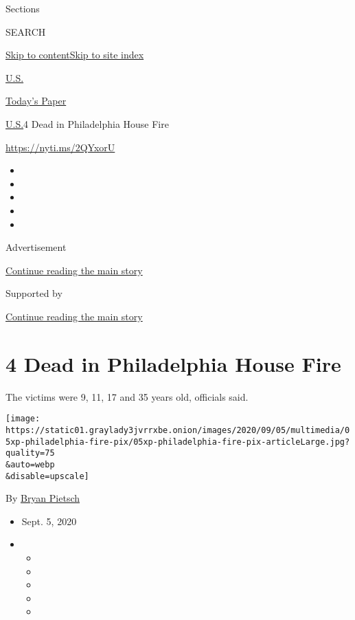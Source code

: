 Sections

SEARCH

\protect\hyperlink{site-content}{Skip to
content}\protect\hyperlink{site-index}{Skip to site index}

\href{https://www.nytimes3xbfgragh.onion/section/us}{U.S.}

\href{https://myaccount.nytimes3xbfgragh.onion/auth/login?response_type=cookie\&client_id=vi}{}

\href{https://www.nytimes3xbfgragh.onion/section/todayspaper}{Today's
Paper}

\href{/section/us}{U.S.}\textbar{}4 Dead in Philadelphia House Fire

\url{https://nyti.ms/2QYxorU}

\begin{itemize}
\item
\item
\item
\item
\item
\end{itemize}

Advertisement

\protect\hyperlink{after-top}{Continue reading the main story}

Supported by

\protect\hyperlink{after-sponsor}{Continue reading the main story}

\hypertarget{4-dead-in-philadelphia-house-fire}{%
\section{4 Dead in Philadelphia House
Fire}\label{4-dead-in-philadelphia-house-fire}}

The victims were 9, 11, 17 and 35 years old, officials said.

\texttt{[image: https://static01.graylady3jvrrxbe.onion/images/2020/09/05/multimedia/05xp-philadelphia-fire-pix/05xp-philadelphia-fire-pix-articleLarge.jpg?quality=75\\\&auto=webp\\\&disable=upscale]}

By \href{https://www.nytimes3xbfgragh.onion/by/bryan-pietsch}{Bryan
Pietsch}

\begin{itemize}
\item
  Sept. 5, 2020
\item
  \begin{itemize}
  \item
  \item
  \item
  \item
  \item
  \end{itemize}
\end{itemize}

